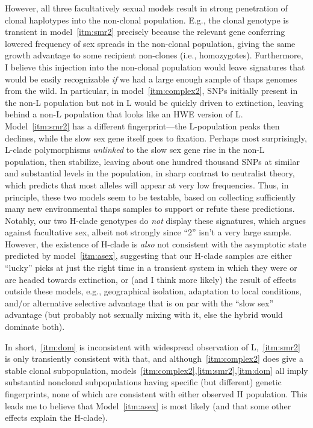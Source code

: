 \documentclass{article}\usepackage[]{graphicx}\usepackage[]{color}
\begin{document}
However, all three facultatively sexual models result in strong penetration of clonal haplotypes
into the non-clonal population.  E.g., the clonal genotype is transient in model~\ref{itm:smr2}
precisely because the relevant gene conferring lowered frequency of sex spreads in the non-clonal
population, giving the same growth advantage to some recipient non-clones (i.e., homozygotes).
Furthermore, I believe this injection into the non-clonal population would leave signatures that
would be easily recognizable \textit{if} we had a large enough sample of thaps genomes from the
wild.  In particular, in model~\ref{itm:complex2}, SNPs initially present in the non-L population
but not in L would be quickly driven to extinction, leaving behind a non-L population that looks
like an HWE version of L.  Model~\ref{itm:smr2} has a different fingerprint---the L-population peaks
then declines, while the slow sex gene itself goes to fixation.  Perhaps most surprisingly, L-clade
polymorphisms \textit{unlinked} to the slow sex gene rise in the non-L population, then stabilize,
leaving about one hundred thousand SNPs at similar and substantial levels in the population, in
sharp contrast to neutralist theory, which predicts that most alleles will appear at very low
frequencies.  Thus, in principle, these two models seem to be testable, based on collecting
sufficiently many new environmental thaps samples to support or refute these predictions.  Notably,
our two H-clade genotypes do \textit{not} display these signatures, which argues against facultative
sex, albeit not strongly since ``2'' isn't a very large sample.  However, the existence of H-clade
is \textit{also} not consistent with the asymptotic state predicted by model~\ref{itm:asex},
suggesting that our H-clade samples are either ``lucky'' picks at just the right time in a transient
system in which they were or are headed towards extinction, or (and I think more likely) the result
of effects outside these models, e.g., geographical isolation, adaptation to local conditions,
and/or alternative selective advantage that is on par with the ``slow sex'' advantage (but probably
not sexually mixing with it, else the hybrid would dominate both).

In short,~\ref{itm:dom} is inconsistent with widespread observation of L,~\ref{itm:smr2} is only
transiently consistent with that, and although~\ref{itm:complex2} does give a stable clonal
subpopulation, models~\ref{itm:complex2},\ref{itm:smr2},\ref{itm:dom} all imply substantial
nonclonal subpopulations having specific (but different) genetic fingerprints, none of which are
consistent with either observed H population.  This leads me to believe that Model~\ref{itm:asex} is
most likely (and that some other effects explain the H-clade).
\end{document}
